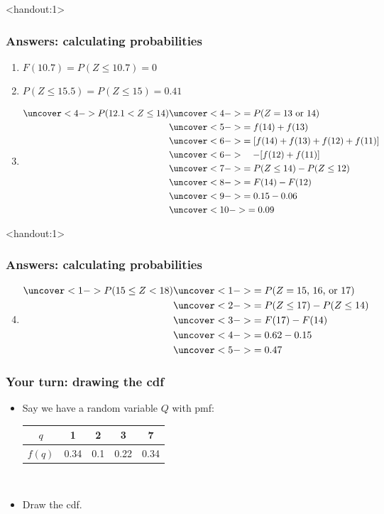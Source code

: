 \documentclass[handout]{beamer}\usepackage{graphicx, color}
\newcommand{\answers}{1}
\providecommand{\q}{$\quad$ \newline}
\numberwithin{equation}{section}
\begin{document}
\begin{frame}<handout:\answers>
\frametitle{Answers: calculating probabilities}
\begin{enumerate}[1. ]
\pause \item $F(10.7) = P(Z \le 10.7) = 0$
\pause \item $P(Z \le 15.5) = P(Z \le 15)  = 0.41$
\pause \item \begin{align*}
\uncover<4->{P( 12.1 < Z \le 14)} & \uncover<4->{= P(Z = \text{13 or 14})} \\
& \uncover<5->{ = f(14) + f(13)} \\
& \uncover<6->{ = [f(14) + f(13) + f(12) + f(11)] } \\
& \uncover<6->{\quad - [f(12) + f(11)]} \\
& \uncover<7->{= P(Z \le 14) - P(Z \le 12)} \\
& \uncover<8->{ = F(14) - F(12)} \\
& \uncover<9->{= 0.15 - 0.06} \\
& \uncover<10->{= 0.09}
\end{align*}
\end{enumerate}
\end{frame}

\begin{frame}<handout:\answers>
\frametitle{Answers: calculating probabilities}
\begin{enumerate}
\setcounter{enumi}{3}
\item 
\begin{align*}
\uncover<1->{P(15 \le Z <  18)} & \uncover<1->{= P(Z = \text{15, 16, or 17})} \\
& \uncover<2->{= P(Z \le 17) - P(Z \le 14)} \\
& \uncover<3->{= F(17) - F(14)} \\
& \uncover<4->{= 0.62 - 0.15} \\
& \uncover<5->{= 0.47}
\end{align*}
\end{enumerate}
\end{frame}


\begin{frame}
\frametitle{Your turn: drawing the cdf}

\begin{itemize}
\item Say we have a random variable $Q$ with pmf: \q \q
\begin{tabular}{ccccc}
$q$ & 1 & 2 & 3 & 7  \\ \hline
$f(q)$ & 0.34 & 0.1 & 0.22 & 0.34\\
\end{tabular} \q
\item Draw the cdf.
\end{itemize}
\end{frame}
\end{document}
